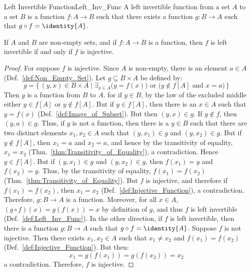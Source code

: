         \begin{fdefinition}{Left Invertible Function}{Left_Inv_Func}
            A left invertible function from a set $A$ to a set $B$ is a function
            $f:A\rightarrow{B}$ such that there exists a function
            $g:B\rightarrow{A}$ such that $g\circ{f}=\identity{A}$.
        \end{fdefinition}
        \begin{theorem}
            \label{thm:Left_Inv_iff_Inj}%
            If $A$ and $B$ are non-empty sets, and if $f:A\rightarrow{B}$ is a
            function, then $f$ is left invertible if and only if $f$ is
            injective.
        \end{theorem}
        \begin{proof}
            For suppose $f$ is injective. Since $A$ is non-empty, there is an
            element $a\in{A}$ (Def.~\ref{def:Non_Empty_Set}). Let
            $g\subseteq{B}\times{A}$ be defined by:
            \begin{equation}
                g=\{\,(y,x)\in{B}\times{A}\;|\;\exists_{x\in{A}}
                    \big(y=f(x)\big)\textrm{ or }
                    \big(y\notin{f}[A]\textrm{ and }x=a\big)\,\}
            \end{equation}
            Then $g$ is a function from $B$ to $A$. for if $y\in{B}$, by the law
            of the excluded middle either $y\in{f}[A]$ or $y\notin{f}[A]$. But
            if $y\in{f}[A]$, then there is an $x\in{A}$ such that $y=f(x)$
            (Def.~\ref{def:Image_of_Subset}). But then $(y,x)\in{g}$.
            If $y\notin{f}$, then $(y,a)\in{g}$. Thus, if $g$ is not a function,
            then there is a $y\in{B}$ such that there are two distinct elements
            $x_{1},x_{2}\in{A}$ such that $(y,x_{1})\in{g}$ and
            $(y,x_{2})\in{g}$. But if $y\notin{f}[A]$, then $x_{1}=a$ and
            $x_{2}=a$, and hence by the transitivity of equality, $x_{1}=x_{2}$
            (Thm.~\ref{thm:Transitivity_of_Equality}), a contradiction.
            Hence $y\in{f}[A]$. But if $(y,x_{1})\in{g}$ and
            $(y,x_{2})\in{g}$, then $f(x_{1})=y$ and $f(x_{2})=y$. Thus, by the
            transitivity of equality, $f(x_{1})=f(x_{2})$
            (Thm.~\ref{thm:Transitivity_of_Equality}). But $f$ is injective, and
            therefore if $f(x_{1})=f(x_{2})$, then $x_{1}=x_{2}$
            (Def.~\ref{def:Injective_Function}), a contradiction. Therefore,
            $g:B\rightarrow{A}$ is a function. Moreover, for all
            $x\in{A}$, $(g\circ{f})(x)=g(f(x))=x$ by definition of $g$, and
            thus $f$ is left invertible (Def.~\ref{def:Left_Inv_Func}). In the
            other direction, if $f$ is left invertible, then there is a function
            $g:B\rightarrow{A}$ such that $g\circ{f}=\identity{A}$. Suppose $f$
            is not injective. Then there exists $x_{1},x_{2}\in{A}$ such that
            $x_{1}\ne{x}_{2}$ and $f(x_{1})=f(x_{2})$
            (Def.~\ref{def:Injective_Function}). But then:
            \begin{equation}
                x_{1}=g(f(x_{1}))=g(f(x_{2}))=x_{2}
            \end{equation}
            a contradiction. Therefore, $f$ is injective.
        \end{proof}
